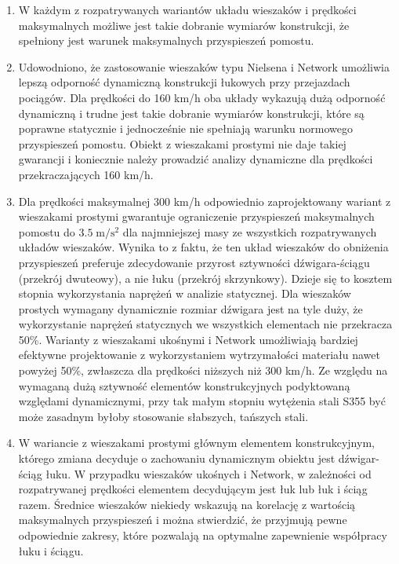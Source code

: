 \begin{enumerate}
	
\item W każdym z rozpatrywanych wariantów układu wieszaków i prędkości maksymalnych możliwe jest takie dobranie wymiarów konstrukcji, że spełniony jest warunek maksymalnych przyspieszeń pomostu.
	
\item Udowodniono, że zastosowanie wieszaków typu Nielsena i Network umożliwia lepszą odporność dynamiczną konstrukcji łukowych przy przejazdach pociągów. Dla prędkości do 160 km/h oba układy wykazują dużą odporność dynamiczną i trudne jest takie dobranie wymiarów konstrukcji, które są poprawne statycznie i jednocześnie nie spełniają warunku normowego przyspieszeń pomostu. Obiekt z wieszakami prostymi nie daje takiej gwarancji i koniecznie należy prowadzić analizy dynamiczne dla prędkości przekraczających 160 km/h. 

\item Dla prędkości maksymalnej 300 km/h odpowiednio zaprojektowany wariant z wieszakami prostymi gwarantuje ograniczenie przyspieszeń maksymalnych pomostu do $3.5\;\mathrm{m/s^2}$ dla najmniejszej masy ze wszystkich rozpatrywanych układów wieszaków. Wynika to z faktu, że ten układ wieszaków do obniżenia przyspieszeń preferuje zdecydowanie przyrost sztywności dźwigara-ściągu (przekrój dwuteowy), a nie łuku (przekrój skrzynkowy). Dzieje się to kosztem stopnia wykorzystania naprężeń w analizie statycznej. Dla wieszaków prostych wymagany dynamicznie rozmiar dźwigara jest na tyle duży, że wykorzystanie naprężeń statycznych we wszystkich elementach nie przekracza 50\%. Warianty z wieszakami ukośnymi i Network umożliwiają bardziej efektywne projektowanie z wykorzystaniem wytrzymałości materiału nawet powyżej 50\%, zwłaszcza dla prędkości niższych niż 300 km/h. Ze względu na wymaganą dużą sztywność elementów konstrukcyjnych podyktowaną względami dynamicznymi, przy tak małym stopniu wytężenia stali S355 być może zasadnym byłoby stosowanie słabszych, tańszych stali.

\item W wariancie z wieszakami prostymi głównym elementem konstrukcyjnym, którego zmiana decyduje o zachowaniu dynamicznym obiektu jest dźwigar-ściąg łuku. W przypadku wieszaków ukośnych i Network, w zależności od rozpatrywanej prędkości elementem decydującym jest łuk lub łuk i ściąg razem. Średnice wieszaków niekiedy wskazują na korelację z wartością maksymalnych przyspieszeń i można stwierdzić, że przyjmują pewne odpowiednie zakresy, które pozwalają na optymalne zapewnienie współpracy łuku i ściągu.


\end{enumerate}

